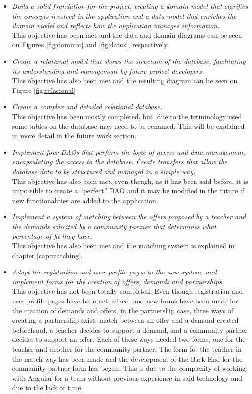 \documentclass[11pt]{book}
\begin{document}
	\begin{itemize}
		\item \emph{Build a solid foundation for the project, creating a domain model that clarifies the concepts involved in the application and a data model that enriches the domain model and reflects how the application manages information.}\\
		This objective has been met and the data and domain diagrams can be seen on Figures  \ref{fig:dominio} and \ref{fig:datos}, respectively.
		\item \emph{Create a relational model that shows the structure of the database, facilitating its understanding and management by future project developers.}\\
		This objective has also been met and the resulting diagram can be seen on Figure \ref{fig:relacional}
		\item \emph{Create a complex and detailed relational database.}\\
		This objective has been mostly completed, but, due to the terminology used some tables on the database may need to be renamed. This will be explained in more detail in the future work section.
		\item \emph{Implement four DAOs that perform the logic of access and data management, encapsulating the access to the database. Create transfers that allow the database data to be structured and managed in a simple way.}\\
		This objective has also been met, even though, as it has been said before, it is impossible to create a ``perfect'' DAO and it may be modified in the future if new functionalities are added to the application.
		\item \emph{Implement a system of matching between the offers proposed by a teacher and the demands solicited by a community partner that determines what percentage of fit they have.}\\
		This objective has also been met and the matching system is explained in chapter \ref{cap:matching}.
		\item \emph{ Adapt the registration and user profile pages to the new system, and implement forms for the creation of offers, demands and partnerships.}\\
		This objective has not been totally completed. Even though registration and user profile pages have been actualized, and new forms have been made for the creation of demands and offers, in the partnership case, three ways of creating a partnership exist: match between an offer and a demand created beforehand, a teacher decides to support a demand, and a community partner decides to support an offer. Each of these ways needed two forms, one for the teacher and another for the community partner. The form for the teacher in the match way has been made and the development of the Back-End for the community partner form has begun. This is due to the complexity of working with Angular for a team without previous experience in said technology and due to the lack of time.

\end{itemize}
\end{document}
